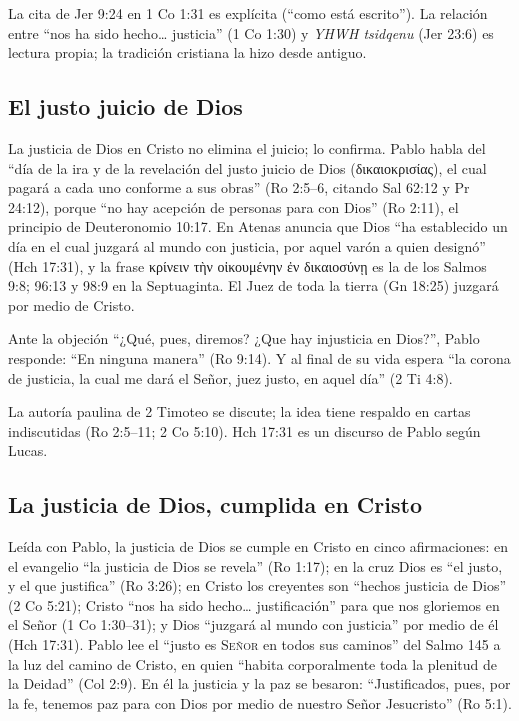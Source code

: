 \documentclass[11pt,letterpaper]{article}
\newcommand{\grc}[1]{\foreignlanguage{ancientgreek}{#1}}
\newcommand{\SENOR}{\textsc{Señor}}
\begin{document}
\begin{nota}[Precisión]
La cita de Jer 9:24 en 1 Co 1:31 es explícita (``como está escrito''). La relación entre ``nos ha sido hecho\ldots{} justicia'' (1 Co 1:30) y \emph{YHWH tsidqenu} (Jer 23:6) es lectura propia; la tradición cristiana la hizo desde antiguo.
\end{nota}

\subsection{El justo juicio de Dios}
La justicia de Dios en Cristo no elimina el juicio; lo confirma. Pablo habla del ``día de la ira y de la revelación del justo juicio de Dios (\grc{δικαιοκρισίας}), el cual pagará a cada uno conforme a sus obras'' (Ro 2:5--6, citando Sal 62:12 y Pr 24:12), porque ``no hay acepción de personas para con Dios'' (Ro 2:11), el principio de Deuteronomio 10:17. En Atenas anuncia que Dios ``ha establecido un día en el cual juzgará al mundo con justicia, por aquel varón a quien designó'' (Hch 17:31), y la frase \grc{κρίνειν τὴν οἰκουμένην ἐν δικαιοσύνῃ} es la de los Salmos 9:8; 96:13 y 98:9 en la Septuaginta. El Juez de toda la tierra (Gn 18:25) juzgará por medio de Cristo.

Ante la objeción ``¿Qué, pues, diremos? ¿Que hay injusticia en Dios?'', Pablo responde: ``En ninguna manera'' (Ro 9:14). Y al final de su vida espera ``la corona de justicia, la cual me dará el Señor, juez justo, en aquel día'' (2 Ti 4:8).

\begin{nota}[Precisión]
La autoría paulina de 2 Timoteo se discute; la idea tiene respaldo en cartas indiscutidas (Ro 2:5--11; 2 Co 5:10). Hch 17:31 es un discurso de Pablo según Lucas.
\end{nota}

\subsection{La justicia de Dios, cumplida en Cristo}
Leída con Pablo, la justicia de Dios se cumple en Cristo en cinco afirmaciones: en el evangelio ``la justicia de Dios se revela'' (Ro 1:17); en la cruz Dios es ``el justo, y el que justifica'' (Ro 3:26); en Cristo los creyentes son ``hechos justicia de Dios'' (2 Co 5:21); Cristo ``nos ha sido hecho\ldots{} justificación'' para que nos gloriemos en el Señor (1 Co 1:30--31); y Dios ``juzgará al mundo con justicia'' por medio de él (Hch 17:31). Pablo lee el ``justo es \SENOR{} en todos sus caminos'' del Salmo 145 a la luz del camino de Cristo, en quien ``habita corporalmente toda la plenitud de la Deidad'' (Col 2:9). En él la justicia y la paz se besaron: ``Justificados, pues, por la fe, tenemos paz para con Dios por medio de nuestro Señor Jesucristo'' (Ro 5:1).
\end{document}
